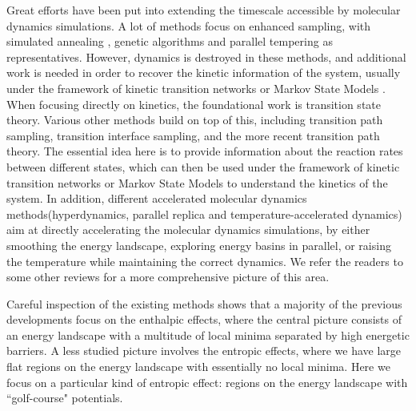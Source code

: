 \documentclass[english, aip, jcp, priprint, graphicx,floatfix]{revtex4-1}
\theoremstyle{plain}
\theoremstyle{definition}
\theoremstyle{plain}
\begin{document}
Great efforts have been put into extending the timescale accessible by molecular dynamics simulations. A lot of methods focus on enhanced sampling, with simulated annealing \cite{Kirkpatrick1983-su}, genetic algorithms\cite{Goldberg1989-ko} and parallel tempering\cite{Sugita1999-vh} as representatives. However, dynamics is destroyed in these methods, and additional work\cite{Yang2007-gn, Andrec2005-fh, Zheng2009-ow, Huang2010-uu} is needed in order to recover the kinetic information of the system, usually under the framework of kinetic transition networks\cite{Noe2006-cs, Wales2006-ur} or Markov State Models \cite{Pande2010-yi, Chodera2014-bh, Husic2018-xp}. When focusing directly on kinetics, the foundational work is transition state theory\cite{Eyring1935-ur, Chandler1978-bq, Wigner1997-kk}. Various other methods build on top of this, including  transition path sampling\cite{Dellago1998-lb, Bolhuis2002-ws}, transition interface sampling\cite{Van_Erp2005-vw}, and the more recent transition path theory\cite{E2006-fm, E2010-sr}. The essential idea here is to provide information about the reaction rates between different states, which can then be used under the framework of kinetic transition networks\cite{Noe2006-cs, Wales2006-ur} or Markov State Models \cite{Pande2010-yi, Chodera2014-bh, Husic2018-xp} to understand the kinetics of the system. In addition, different accelerated molecular dynamics methods\cite{Perez2009-jy}(hyperdynamics\cite{Voter1997-gi}, parallel replica\cite{Voter1998-mv} and temperature-accelerated dynamics\cite{Sorensen2000-qm}) aim at directly accelerating the molecular dynamics simulations, by either smoothing the energy landscape, exploring energy basins in parallel, or raising the temperature while maintaining the correct dynamics. We refer the readers to some other reviews\cite{Klenin2011-jf, Christen2008-ge, Perez2009-jy} for a more comprehensive picture of this area.

Careful inspection of the existing methods shows that a majority of the previous developments focus on the enthalpic effects, where the central picture consists of an energy landscape with a multitude of local minima separated by high energetic barriers. A less studied picture involves the entropic effects, where we have large flat regions on the energy landscape with essentially no local minima. Here we focus on a particular kind of entropic effect: regions on the energy landscape with ``golf-course" potentials.
\end{document}
